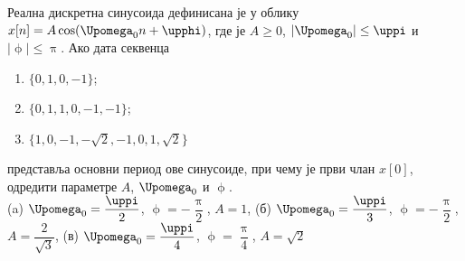 \noindent\PID
Реална дискретна
синусоида дефинисана је у облику 
$x[n] = A \cos(\Upomega_0 n + \upphi)$, 
где је $A\geq0$, $|\Upomega_0| \leq \uppi$ и $|\upphi|
\leq \uppi$. Ако 
дата секвенца
\begin{multicols}{2}
\begin{enumerate}[label=(\alph*)]
\item $\{0,1,0,-1\}$;
\item $\{0,1,1,0,-1,-1\}$;
\item $\{1,0,-1,-\sqrt{2}, -1, 0, 1, 
\sqrt 2 \}$ 
\end{enumerate}
\end{multicols} \noindent
представља основни период
ове синусоиде, при чему је први члан 
$x[0]$, одредити параметре 
$A$, $\Upomega_0$ и $\upphi$.
\\[2mm]

\REZULTAT 
(a) $\Upomega_0 = \dfrac{\uppi}{2}$, 
$\upphi = -\dfrac{\uppi}{2}$, 
$A = 1$,
(б) $\Upomega_0 = \dfrac{\uppi}{3}$, 
$\upphi = -\dfrac{\uppi}{2}$, 
$A = \dfrac{2}{\sqrt 3}$,
(в) $\Upomega_0 = \dfrac{\uppi}{4}$, 
$\upphi = \dfrac{\uppi}{4}$, 
$A = \sqrt2$ 